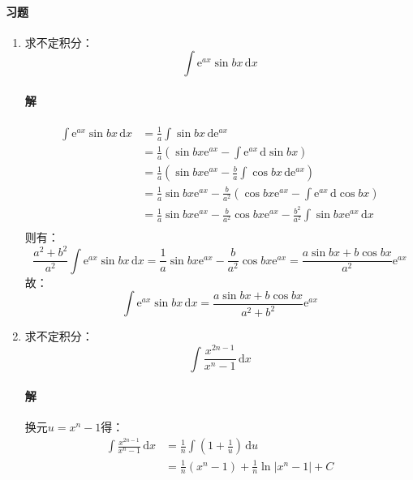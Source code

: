 \documentclass[fontset=none,openany,a4paper]{ctexbook}
\begin{document}
\paragraph{习题}

\begin{enumerate}

    \item 求不定积分：
    \[
    \int \mathrm{e}^{ax}\sin bx\,\mathrm{d}x
    \]

    \paragraph{解}

    \begin{align*}
        \int \mathrm{e}^{ax}\sin bx\,\mathrm{d}x
        &= \frac{1}{a}\int \sin bx\,\mathrm{d}\mathrm{e}^{ax} \\
        &= \frac{1}{a}\left(\sin bx\mathrm{e}^{ax} - \int \mathrm{e}^{ax}\,\mathrm{d}\sin bx\right) \\
        &= \frac{1}{a}\left(\sin bx\mathrm{e}^{ax} - \frac{b}{a}\int \cos bx\,\mathrm{d}\mathrm{e}^{ax}\right) \\
        &= \frac{1}{a}\sin bx\mathrm{e}^{ax} - \frac{b}{a^2}\left(\cos bx\mathrm{e}^{ax} - \int \mathrm{e}^{ax}\,\mathrm{d}\cos bx\right) \\
        &= \frac{1}{a}\sin bx\mathrm{e}^{ax} - \frac{b}{a^2}\cos bx\mathrm{e}^{ax} - \frac{b^2}{a^2}\int \sin bx\mathrm{e}^{ax}\,\mathrm{d}x \\
    \end{align*}
    则有：
    \[
    \frac{a^2+b^2}{a^2}\int \mathrm{e}^{ax}\sin bx\,\mathrm{d}x = \frac{1}{a}\sin bx\mathrm{e}^{ax} - \frac{b}{a^2}\cos bx\mathrm{e}^{ax} = \frac{a\sin bx + b\cos bx}{a^2}\mathrm{e}^{ax}
    \]
    故：
    \[
    \int \mathrm{e}^{ax}\sin bx\,\mathrm{d}x = \frac{a\sin bx + b\cos bx}{a^2+b^2}\mathrm{e}^{ax}
    \]

    \item 求不定积分：
    \[
    \int \frac{x^{2n-1}}{x^n-1}\,\mathrm{d}x
    \]

    \paragraph{解}

    换元$u=x^n-1$得：
    \begin{align*}
        \int \frac{x^{2n-1}}{x^n-1}\,\mathrm{d}x
        &= \frac{1}{n}\int \left(1+\frac{1}{u}\right)\,\mathrm{d}u \\
        &= \frac{1}{n}(x^n - 1) + \frac{1}{n}\ln|x^n-1| + C
    \end{align*}


\end{enumerate}
\end{document}
